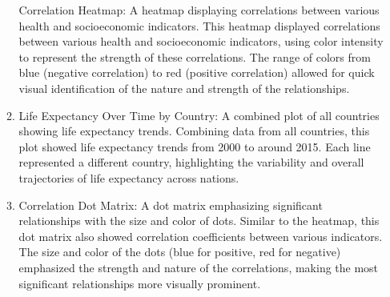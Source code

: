 \documentclass[
]{article}
\begin{document}
\begin{enumerate}
\begin{enumerate}
    Correlation Heatmap: A heatmap displaying correlations between
    various health and socioeconomic indicators. This heatmap displayed
    correlations between various health and socioeconomic indicators,
    using color intensity to represent the strength of these
    correlations. The range of colors from blue (negative correlation)
    to red (positive correlation) allowed for quick visual
    identification of the nature and strength of the relationships.
  \item
    Life Expectancy Over Time by Country: A combined plot of all
    countries showing life expectancy trends. Combining data from all
    countries, this plot showed life expectancy trends from 2000 to
    around 2015. Each line represented a different country, highlighting
    the variability and overall trajectories of life expectancy across
    nations.
  \item
    Correlation Dot Matrix: A dot matrix emphasizing significant
    relationships with the size and color of dots. Similar to the
    heatmap, this dot matrix also showed correlation coefficients
    between various indicators. The size and color of the dots (blue for
    positive, red for negative) emphasized the strength and nature of
    the correlations, making the most significant relationships more
    visually prominent.
  \end{enumerate}
\end{enumerate}
\end{document}
